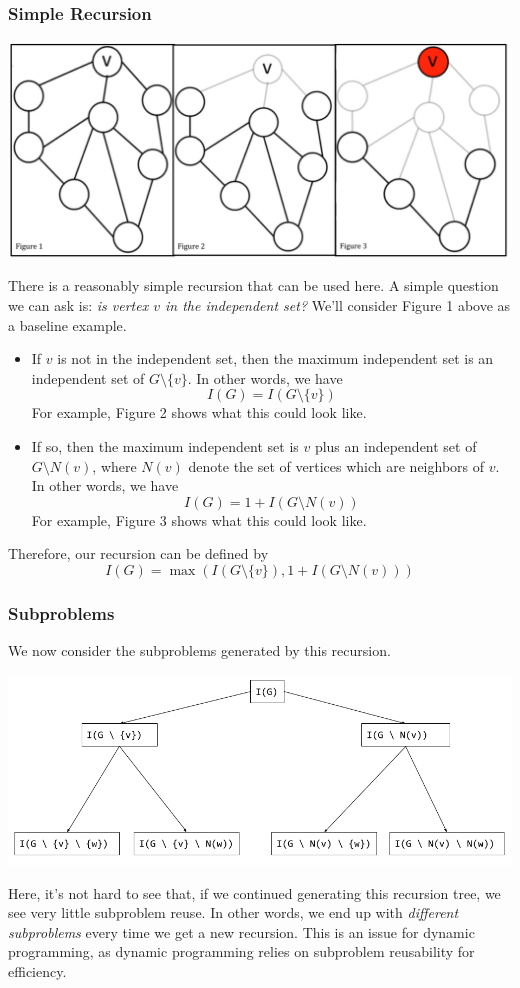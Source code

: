 \documentclass[letterpaper]{article}
\begin{document}
\subsubsection{Simple Recursion}
\begin{center}
    \includegraphics[scale=0.35]{../assets/ind_set_ex.png}
\end{center}

There is a reasonably simple recursion that can be used here. A simple question we can ask is: \emph{is vertex $v$ in the independent set?} We'll consider Figure 1 above as a baseline example.
\begin{itemize}
    \item If $v$ is not in the independent set, then the maximum independent set is an independent set of $G \setminus \{v\}$. In other words, we have 
    \[I(G) = I(G \setminus \{v\})\]
    For example, Figure 2 shows what this could look like.
    \item If so, then the maximum independent set is $v$ plus an independent set of $G \setminus N(v)$, where $N(v)$ denote the set of vertices which are neighbors of $v$. In other words, we have 
    \[I(G) = 1 + I(G \setminus N(v))\]
    For example, Figure 3 shows what this could look like.
\end{itemize}
Therefore, our recursion can be defined by 
\[I(G) = \max(I(G \setminus \{v\}), 1 + I(G \setminus N(v)))\]


\subsubsection{Subproblems}
We now consider the subproblems generated by this recursion. 
\begin{center}
    \includegraphics[scale=0.5]{../assets/indep_set_sub.png}
\end{center}
Here, it's not hard to see that, if we continued generating this recursion tree, we see very little subproblem reuse. In other words, we end up with \emph{different subproblems} every time we get a new recursion. This is an issue for dynamic programming, as dynamic programming relies on subproblem reusability for efficiency.  
\end{document}
